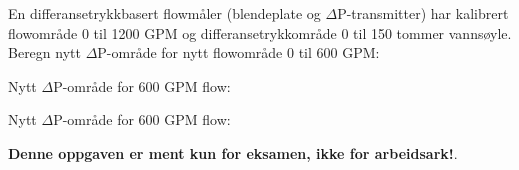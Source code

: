 

En differansetrykkbasert flowmåler (blendeplate og $\Delta$P-transmitter) har kalibrert flowområde 0 til 1200 GPM og differansetrykkområde 0 til 150 tommer vannsøyle. Beregn nytt $\Delta$P-område for nytt flowområde 0 til 600 GPM:

\vskip 10pt

Nytt $\Delta$P-område for 600 GPM flow: \underbar{\hskip 50pt}







Nytt $\Delta$P-område for 600 GPM flow: 







{\bf Denne oppgaven er ment kun for eksamen, ikke for arbeidsark!}.

